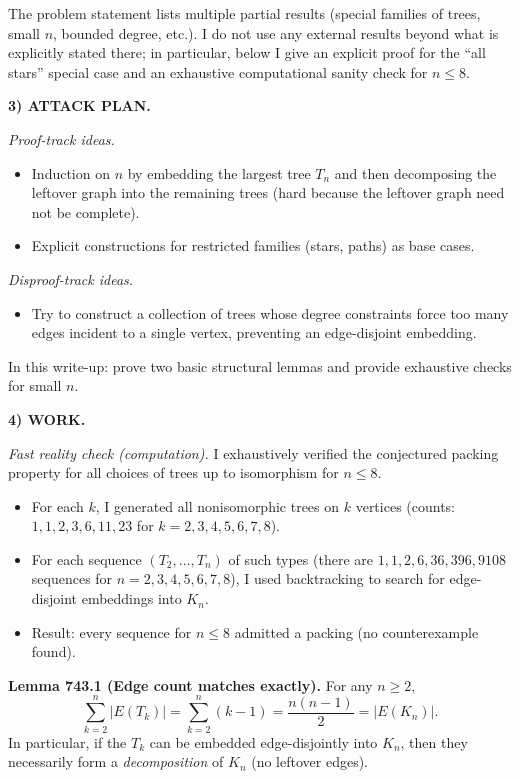 The problem statement lists multiple partial results (special families of trees, small $n$, bounded degree, etc.). I do not use any external results beyond what is explicitly stated there; in particular, below I give an explicit proof for the ``all stars'' special case and an exhaustive computational sanity check for $n\le 8$.

\medskip
\noindent\textbf{3) ATTACK PLAN.}

\emph{Proof-track ideas.}
\begin{itemize}
\item Induction on $n$ by embedding the largest tree $T_n$ and then decomposing the leftover graph into the remaining trees (hard because the leftover graph need not be complete).
\item Explicit constructions for restricted families (stars, paths) as base cases.
\end{itemize}
\emph{Disproof-track ideas.}
\begin{itemize}
\item Try to construct a collection of trees whose degree constraints force too many edges incident to a single vertex, preventing an edge-disjoint embedding.
\end{itemize}
In this write-up: prove two basic structural lemmas and provide exhaustive checks for small $n$.

\medskip
\noindent\textbf{4) WORK.}

\noindent\emph{Fast reality check (computation).}
I exhaustively verified the conjectured packing property for all choices of trees up to isomorphism for $n\le 8$.
\begin{itemize}
\item For each $k$, I generated all nonisomorphic trees on $k$ vertices (counts: $1,1,2,3,6,11,23$ for $k=2,3,4,5,6,7,8$).
\item For each sequence $(T_2,\dots,T_n)$ of such types (there are $1,1,2,6,36,396,9108$ sequences for $n=2,3,4,5,6,7,8$), I used backtracking to search for edge-disjoint embeddings into $K_n$.
\item Result: every sequence for $n\le 8$ admitted a packing (no counterexample found).
\end{itemize}

\medskip
\noindent\textbf{Lemma 743.1 (Edge count matches exactly).}
For any $n\ge 2$,
\[
\sum_{k=2}^n |E(T_k)| = \sum_{k=2}^n (k-1) = \frac{n(n-1)}{2} = |E(K_n)|.
\]
In particular, if the $T_k$ can be embedded edge-disjointly into $K_n$, then they necessarily form a \emph{decomposition} of $K_n$ (no leftover edges).

